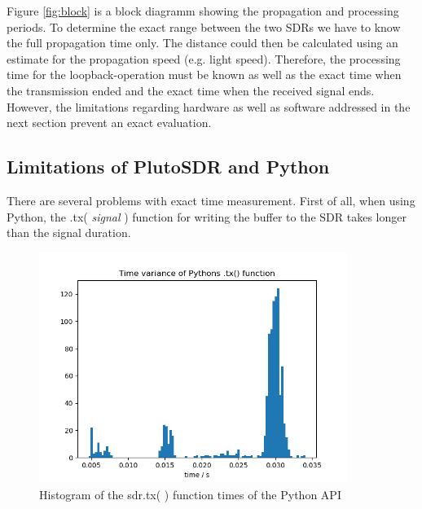 \documentclass[journal]{IEEEtran}
\begin{document}
Figure \ref{fig:block} is a block diagramm showing the propagation and processing periods.
To determine the exact range between the two SDRs we have to know the full propagation time only. 
The distance could then be calculated using an estimate for the propagation speed (e.g. light speed). 
Therefore, the processing time for the loopback-operation must be known as well as the exact time when the transmission ended and the exact time when the received signal ends.
However, the limitations regarding hardware as well as software addressed in the next section prevent an exact evaluation.

\subsection{Limitations of PlutoSDR and Python}
\label{sec:LimitationPLutoSDR}
There are several problems with exact time measurement.
First of all, when using Python, the .tx( \textit{signal} ) function for writing the buffer to the SDR takes longer than the signal duration.

\begin{figure}[h]
   \includegraphics[width=1\linewidth, height=7.5cm]{fig/python_tx_var.png}
   \caption{ Histogram of the sdr.tx( ) function times of the Python API }
   \label{fig:pytimes}
\end{figure}
\end{document}
